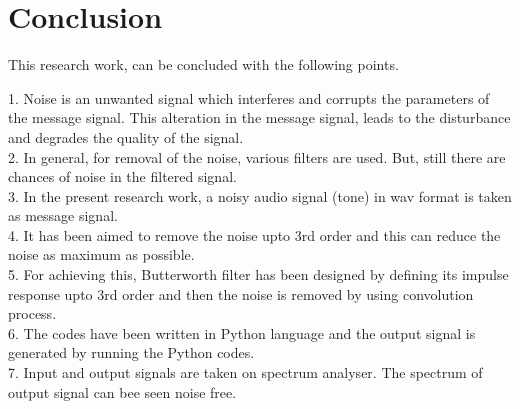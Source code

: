 \documentclass[journal,10pt,twocolumn]{article}
\begin{document}
\section{Conclusion}
\begin{flushleft}

This research work, can be concluded with the following points.\\
\vspace{0.1cm}


1. Noise is an unwanted signal which interferes and corrupts the parameters of the message signal. This alteration in the message signal, leads to the disturbance and degrades the quality of the signal. \\
\vspace{0.2cm}
2. In general, for removal of the noise, various filters are used. But, still there are chances of noise in the filtered signal. \\ 
\vspace{0.2cm}
3. In the present research work, a noisy audio signal (tone) in wav format is taken as message signal.\\
\vspace{0.2cm}
4. It has been aimed to remove the noise upto 3rd order and this can reduce the noise as maximum as possible. \\
\vspace{0.2cm}
5. For achieving this, Butterworth filter has been designed by defining its impulse response upto 3rd order and then the noise is removed by using convolution process. \\
\vspace{0.2cm}
6. The codes have been written in Python language and the output signal is generated by running the Python codes. \\
\vspace{0.2cm}
7. Input and output signals are taken on spectrum analyser. The spectrum of output signal can bee seen noise free. 
\end{flushleft}
\end{document}
